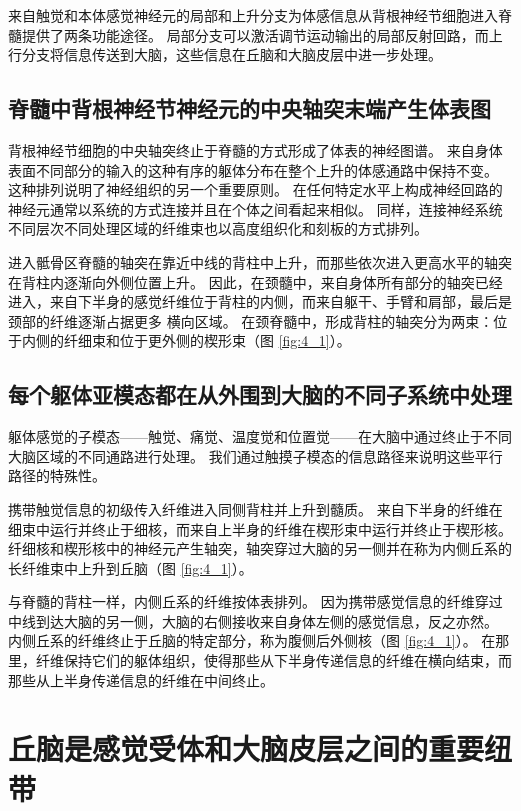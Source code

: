 来自触觉和本体感觉神经元的局部和上升分支为体感信息从背根神经节细胞进入脊髓提供了两条功能途径。 
局部分支可以激活调节运动输出的局部反射回路，而上行分支将信息传送到大脑，这些信息在丘脑和大脑皮层中进一步处理。


\subsection{脊髓中背根神经节神经元的中央轴突末端产生体表图}
背根神经节细胞的中央轴突终止于脊髓的方式形成了体表的神经图谱。 
来自身体表面不同部分的输入的这种有序的躯体分布在整个上升的体感通路中保持不变。 
这种排列说明了神经组织的另一个重要原则。 
在任何特定水平上构成神经回路的神经元通常以系统的方式连接并且在个体之间看起来相似。 
同样，连接神经系统不同层次不同处理区域的纤维束也以高度组织化和刻板的方式排列。


进入骶骨区脊髓的轴突在靠近中线的背柱中上升，而那些依次进入更高水平的轴突在背柱内逐渐向外侧位置上升。 
因此，在颈髓中，来自身体所有部分的轴突已经进入，来自下半身的感觉纤维位于背柱的内侧，而来自躯干、手臂和肩部，最后是颈部的纤维逐渐占据更多 横向区域。 
在颈脊髓中，形成背柱的轴突分为两束：位于内侧的纤细束和位于更外侧的楔形束（图 \ref{fig:4_1}）。


\subsection{每个躯体亚模态都在从外围到大脑的不同子系统中处理}

躯体感觉的子模态——触觉、痛觉、温度觉和位置觉——在大脑中通过终止于不同大脑区域的不同通路进行处理。 
我们通过触摸子模态的信息路径来说明这些平行路径的特殊性。


携带触觉信息的初级传入纤维进入同侧背柱并上升到髓质。 
来自下半身的纤维在细束中运行并终止于细核，而来自上半身的纤维在楔形束中运行并终止于楔形核。 
纤细核和楔形核中的神经元产生轴突，轴突穿过大脑的另一侧并在称为内侧丘系的长纤维束中上升到丘脑（图 \ref{fig:4_1}）。


与脊髓的背柱一样，内侧丘系的纤维按体表排列。 因为携带感觉信息的纤维穿过中线到达大脑的另一侧，大脑的右侧接收来自身体左侧的感觉信息，反之亦然。 
内侧丘系的纤维终止于丘脑的特定部分，称为腹侧后外侧核（图 \ref{fig:4_1}）。 
在那里，纤维保持它们的躯体组织，使得那些从下半身传递信息的纤维在横向结束，而那些从上半身传递信息的纤维在中间终止。


\section{丘脑是感觉受体和大脑皮层之间的重要纽带}

